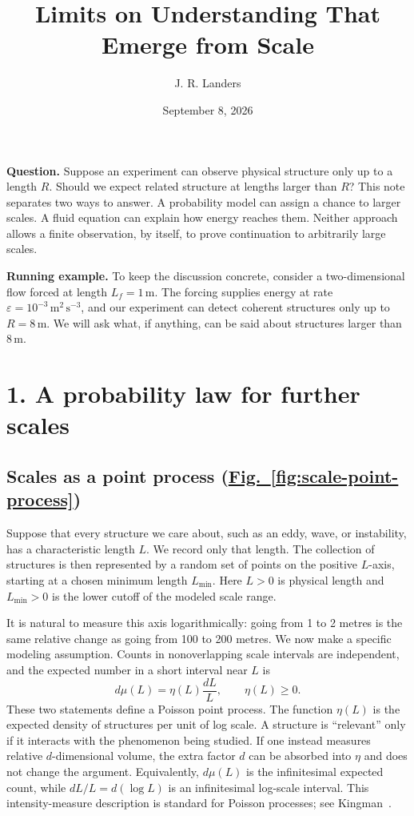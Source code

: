 \documentclass[10pt]{article}
\title{\vspace{-2.3em}\textbf{Limits on Understanding That Emerge from Scale}}
\author{J. R. Landers}
\date{September 8, 2026}
\begin{document}
\maketitle
\vspace{-1.5em}
\small
\setlength{\abovedisplayskip}{6pt plus 2pt minus 1pt}
\setlength{\belowdisplayskip}{6pt plus 2pt minus 1pt}
\setlength{\abovedisplayshortskip}{4pt plus 1pt}
\setlength{\belowdisplayshortskip}{5pt plus 1pt minus 1pt}

\textbf{Question.} Suppose an experiment can observe physical structure only up
to a length $R$. Should we expect related structure at lengths larger than $R$?
This note separates two ways to answer. A probability model can assign a chance
to larger scales. A fluid equation can explain how energy reaches them. Neither
approach allows a finite observation, by itself, to prove continuation to
arbitrarily large scales.

\textbf{Running example.} To keep the discussion concrete, consider a
two-dimensional flow forced at length $L_f=1\,\mathrm m$. The forcing supplies
energy at rate $\varepsilon=10^{-3}\,\mathrm{m^2\,s^{-3}}$, and our experiment
can detect coherent structures only up to $R=8\,\mathrm m$. We will ask what,
if anything, can be said about structures larger than $8\,\mathrm m$.

\section*{1. A probability law for further scales}
\subsection*{Scales as a point process {\normalfont\small(\hyperref[fig:scale-point-process]{Fig.~\ref*{fig:scale-point-process}})}}
Suppose that every structure we care about, such as an eddy, wave, or
instability, has a characteristic length $L$. We record only that length. The
collection of structures is then represented by a random set of points on the
positive $L$-axis, starting at a chosen minimum length $L_{\min}$.
Here $L>0$ is physical length and $L_{\min}>0$ is the lower cutoff of the
modeled scale range.

It is natural to measure this axis logarithmically: going from 1 to 2 metres is
the same relative change as going from 100 to 200 metres. We now make a specific
modeling assumption. Counts in nonoverlapping scale intervals are independent,
and the expected number in a short interval near $L$ is
\[
  d\mu(L)=\eta(L)\frac{dL}{L},\qquad \eta(L)\ge0.
\]
These two statements define a Poisson point process. The function $\eta(L)$ is
the expected density of structures per unit of log scale. A structure is
``relevant'' only if it interacts with the phenomenon being studied. If one
instead measures relative $d$-dimensional volume, the extra factor $d$ can be
absorbed into $\eta$ and does not change the argument.
Equivalently, $d\mu(L)$ is the infinitesimal expected count, while
$dL/L=d(\log L)$ is an infinitesimal log-scale interval. This intensity-measure
description is standard for Poisson processes; see Kingman~\cite{kingman}.
\end{document}
